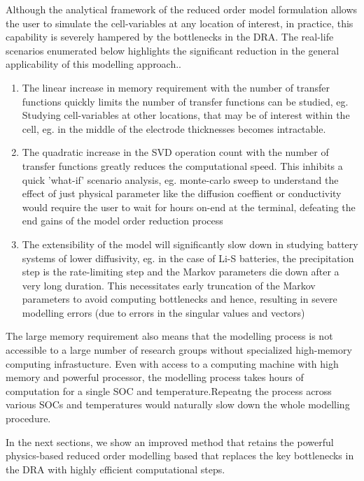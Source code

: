 Although the analytical framework of  the reduced order model formulation allows
the  user  to simulate  the  cell-variables  at  any  location of  interest,  in
practice, this  capability is severely hampered  by the bottlenecks in  the DRA.
The real-life scenarios enumerated below highlights the significant reduction in
the general  applicability of this modelling  approach.. \begin{enumerate} \item
The linear increase in memory requirement  with the number of transfer functions
quickly limits  the number of  transfer functions  can be studied,  eg. Studying
cell-variables at other locations, that may  be of interest within the cell, eg.
in  the middle  of  the  electrode thicknesses  becomes  intractable. \item  The
quadratic  increase in  the  SVD operation  count with  the  number of  transfer
functions  greatly  reduces  the  computational speed.  This  inhibits  a  quick
'what-if' scenario analysis,  eg. monte-carlo sweep to understand  the effect of
just  physical parameter  like  the diffusion  coeffient  or conductivity  would
require the  user to wait  for hours on-end at  the terminal, defeating  the end
gains of the model order reduction  process \item The extensibility of the model
will significantly slow  down in studying battery systems  of lower diffusivity,
eg. in the  case of Li-S batteries, the precipitation  step is the rate-limiting
step  and the  Markov  parameters die  down  after a  very  long duration.  This
necessitates  early  truncation of  the  Markov  parameters to  avoid  computing
bottlenecks and  hence, resulting in severe  modelling errors (due to  errors in
the singular  values and vectors)  \end{enumerate} The large  memory requirement
also means  that the modelling  process is not accessible  to a large  number of
research groups  without specialized  high-memory computing  infrastucture. Even
with access  to a  computing machine  with high  memory and  powerful processor,
the  modelling  process  takes  hours  of  computation  for  a  single  SOC  and
temperature.Repeatng  the process  across  various SOCs  and temperatures  would
naturally slow down the whole modelling procedure.

In  the next  sections, we  show an  improved method  that retains  the powerful
physics-based reduced order modelling based that replaces the key bottlenecks in
the DRA with highly efficient computational steps.

